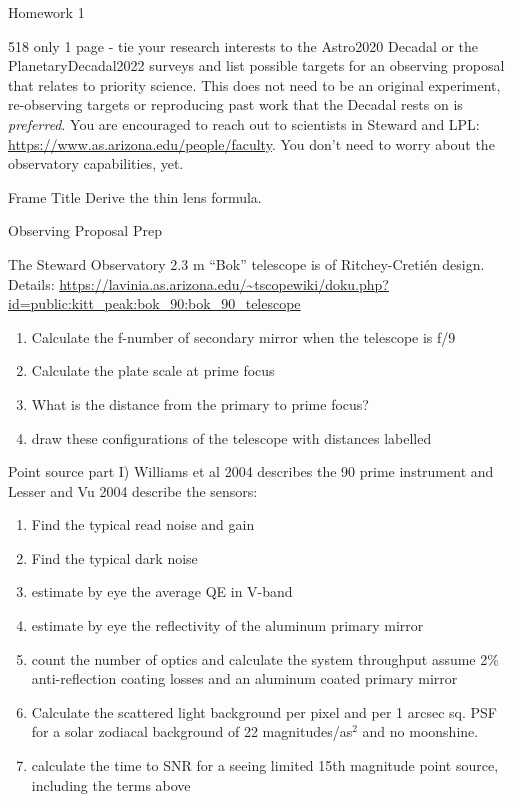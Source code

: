 Homework 1


\begin{frame}{518 only}
    1 page - tie your research interests to the Astro2020 Decadal or the PlanetaryDecadal2022 surveys and list possible targets for an observing proposal that relates to priority science. 
    This does not need to be an original experiment, re-observing targets or reproducing past work that the Decadal rests on is \textit{preferred}.
    You are encouraged to reach out to scientists in Steward and LPL: \url{https://www.as.arizona.edu/people/faculty}.
    You don't need to worry about the observatory capabilities, yet.
\end{frame}
\begin{frame}{Frame Title}
Derive the thin lens formula.

\end{frame}
\begin{frame}{Observing Proposal Prep}
    
The Steward Observatory 2.3 m ``Bok'' telescope is of Ritchey-Cretién design.%
 Details: \url{https://lavinia.as.arizona.edu/~tscopewiki/doku.php?id=public:kitt_peak:bok_90:bok_90_telescope}
 
 \begin{enumerate}
\item Calculate the f-number of secondary mirror when the telescope is f/9
\item Calculate the plate scale at prime focus
\item What is the distance from the primary to prime focus?
\item draw these configurations of the telescope with distances labelled
\end{enumerate}
\end{frame}

\begin{frame}{Point source part I)}
Williams et al 2004 describes the 90 prime instrument and Lesser and Vu 2004 describe the sensors:
\begin{enumerate}
    \item Find the typical read noise and gain
    \item Find the typical dark noise
    \item  estimate by eye the average QE in V-band
    \item estimate by eye the reflectivity of the aluminum primary mirror
    \item count the number of optics and calculate the system throughput assume 2\% anti-reflection coating losses and an aluminum coated primary mirror
    \item Calculate the scattered light background per pixel and per 1 arcsec sq. PSF for a solar zodiacal background of 22 magnitudes/as$^2$ and no moonshine. 
    \item calculate the time to SNR for a seeing limited 15th magnitude point source, including the terms above
\end{enumerate}
    
\end{frame}

